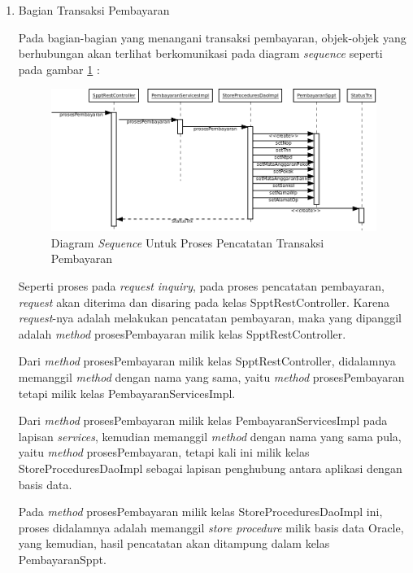 \begin{enumerate}
  
  \item Bagian Transaksi Pembayaran
  
  Pada bagian-bagian yang menangani transaksi pembayaran, objek-objek yang berhubungan akan terlihat berkomunikasi pada diagram \textit{sequence} seperti pada gambar \ref{fig:uml-seq-trx} :
  
  \begin{figure}[H]
    \centering
    \includegraphics[width=1\textwidth]{./resources/uml/uml-seq-trx}
    \caption{Diagram \textit{Sequence} Untuk Proses Pencatatan Transaksi Pembayaran}
    \label{fig:uml-seq-trx}
  \end{figure}
  
  Seperti proses pada \textit{request inquiry}, pada proses pencatatan pembayaran, \textit{request} akan diterima dan disaring pada kelas SpptRestController. Karena \textit{request}-nya adalah melakukan pencatatan pembayaran, maka yang dipanggil adalah \textit{method} prosesPembayaran milik kelas SpptRestController.
  
  Dari \textit{method} prosesPembayaran milik kelas SpptRestController, didalamnya memanggil \textit{method} dengan nama yang sama, yaitu \textit{method} prosesPembayaran tetapi milik kelas PembayaranServicesImpl. 
  
  Dari \textit{method} prosesPembayaran milik kelas PembayaranServicesImpl pada lapisan \textit{services}, kemudian memanggil \textit{method} dengan nama yang sama pula, yaitu \textit{method} prosesPembayaran, tetapi kali ini milik kelas StoreProceduresDaoImpl sebagai lapisan penghubung antara aplikasi dengan basis data.
  
  Pada \textit{method} prosesPembayaran milik kelas StoreProceduresDaoImpl ini, proses didalamnya adalah memanggil \textit{store procedure} milik basis data Oracle, yang kemudian, hasil pencatatan akan ditampung dalam kelas PembayaranSppt.
  

\end{enumerate}

